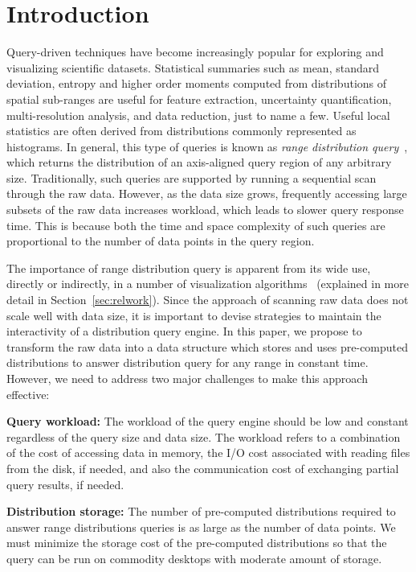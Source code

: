 \section{Introduction}
\label{sec:intro}

Query-driven techniques have become increasingly popular for exploring and visualizing scientific datasets. Statistical summaries such as mean, standard deviation, entropy and higher order moments computed from distributions of spatial sub-ranges are useful for feature extraction, uncertainty quantification, multi-resolution analysis, and data reduction, just to name a few. Useful local statistics are often derived from distributions commonly represented as histograms. In general, this type of queries is known as \emph{range distribution query}~\cite{martin13}, which returns the distribution of an axis-aligned query region of any arbitrary size. Traditionally, such queries are supported by running a sequential scan through the raw data. However, as the data size grows, frequently accessing large subsets of the raw data increases workload, which leads to slower query response time. This is because both the time and space complexity of such queries are proportional to the number of data points in the query region.

The importance of range distribution query is apparent from its wide use, directly or indirectly, in a number of visualization algorithms~\cite{Hixel11, uncertain3d11, qdv11} (explained in more detail in Section~\ref{sec:relwork}). Since the approach of scanning raw data does not scale well with data size, it is important to devise strategies to maintain the interactivity of a distribution query engine. In this paper, we propose to transform the raw data into a data structure which stores and uses pre-computed distributions to answer distribution query for any range in constant time. However, we need to address two major challenges to make this approach effective:
\begin{packed_itemize}
\item {\bf Query workload:} The workload of the query engine should be low and constant regardless of the query size and data size. The workload refers to a combination of the cost of accessing data in memory, the I/O cost associated with reading files from the disk, if needed, and also the communication cost of exchanging partial query results, if needed.
\item {\bf Distribution storage:} The number of pre-computed distributions required to answer range distributions queries is as large as the number of data points. We must minimize the storage cost of the pre-computed distributions so that the query can be run on commodity desktops with moderate amount of storage. 
\end{packed_itemize}

